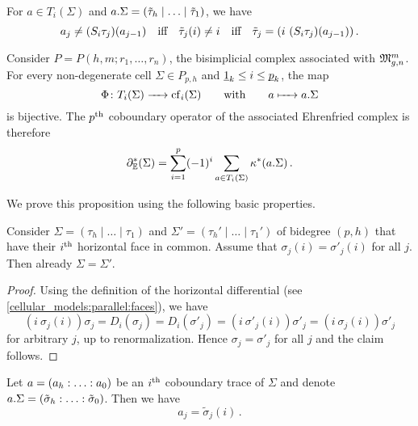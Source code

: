\begin{rem}
    \label{cellular_models:dual_ehrenfried:tilde_tau_i_iS_i}
    For $a \in T_i(\Sigma)$ and $a.\Sigma = \inhom[\tilde\tau]$, we have
    \[
        a_j \neq (S_i\tau_j)(a_{j-1}) \mspc{iff}{10} \tilde\tau_j(i) \neq i \mspc{iff}{10} \tilde\tau_j = (i\ (S_i\tau_j)(a_{j-1})) \,.
    \]
\end{rem}

\begin{prop}
    \label{cellular_models:dual_ehrenfried:cob_tr_equals_cob}
    Consider $P=P(h,m;r_1, \ldots, r_n)$, the bisimplicial complex associated with $\Modspc$.
    For every non-degenerate cell $\Sigma \in P_{p,h}$ and $\ul1_k \le i \le \ul p_k$, the map
    \[
        \Phi \colon T_i(\Sigma) \to \cof_i(\Sigma) \mspc{with}{20} a \mapsto a.\Sigma
    \]
    is bijective.
    The $p\Th$ coboundary operator of the associated Ehrenfried complex is therefore
    \[
        \del_\E^\ast( \Sigma ) = \sum_{i=1}^p (-1)^i \sum_{a \in T_i(\Sigma)} \kappa^\ast(a.\Sigma) \,.
    \]
\end{prop}

We prove this proposition using the following basic properties.

\begin{lem}
    \label{cellular_models:dual_ehrenfried:cob_are_equal_via_sigma_j_i}
    Consider $\Sigma = (\tau_h \mid \ldots \mid \tau_1)$ and $\Sigma' = (\tau_h' \mid \ldots \mid \tau_1')$ of bidegree $(p,h)$
    that have their $i\Th$ horizontal face in common.
    Assume that $\sigma_j(i) = \sigma'_j(i)$ for all $j$.
    Then already $\Sigma = \Sigma'$.
\end{lem}

\begin{proof}
    Using the definition of the horizontal differential (see \ref{cellular_models:parallel:faces}), we have
    \[
        (i\ \sigma_j(i)) \sigma_j = D_i(\sigma_j) = D_i(\sigma'_j) = (i\ \sigma'_j(i)) \sigma'_j = (i\ \sigma_j(i)) \sigma'_j
    \]
    for arbitrary $j$, up to renormalization.
    Hence $\sigma_j = \sigma'_j$ for all $j$ and the claim follows.
\end{proof}

\begin{lem}
    \label{cellular_models:dual_ehrenfried:cob_tr_def_sigma_j_i}
    Let $a = \homog[a]$ be an $i\Th$ coboundary trace of $\Sigma$ and denote $a.\Sigma = \homog[\tilde\sigma]$.
    Then we have
    \[
        a_j = \tilde\sigma_j(i) \,.
    \]
\end{lem}


